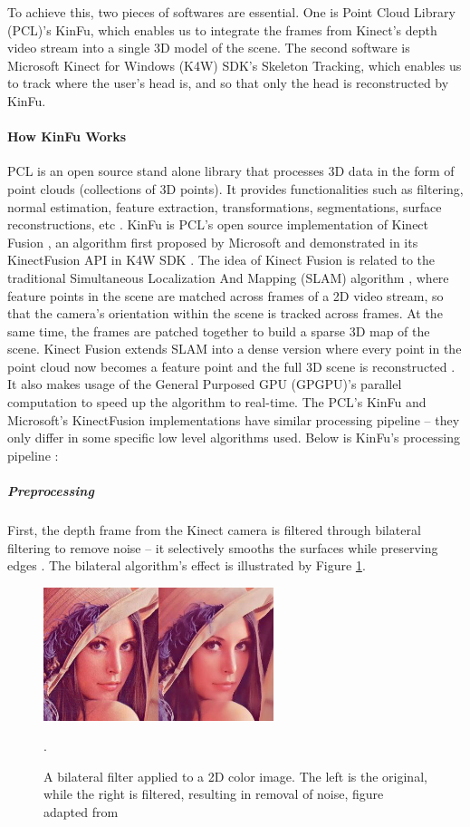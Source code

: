 \documentclass{ut-thesis}
\begin{document}
To achieve this, two pieces of softwares are essential.  One is Point Cloud Library (PCL)'s KinFu, which enables us to integrate the frames from Kinect's depth video stream into a single 3D model of the scene.  The second software is Microsoft Kinect for Windows (K4W) SDK's Skeleton Tracking, which enables us to track where the user's head is, and so that only the head is reconstructed by KinFu.

\paragraph{How KinFu Works}
PCL is an open source stand alone library that processes 3D data in the form of point clouds (collections of 3D points).  It provides functionalities such as filtering, normal estimation, feature extraction, transformations, segmentations, surface reconstructions, etc \cite{rusu20113d}.  KinFu is PCL's open source implementation of Kinect Fusion \cite{pirovano2011kinfu}, an algorithm first proposed by Microsoft and demonstrated in its KinectFusion API in K4W SDK \cite{newcombe2011kinectfusion}.  The idea of Kinect Fusion is related to the traditional Simultaneous Localization And Mapping (SLAM) algorithm \cite{pirovano2011kinfu}, where feature points in the scene are matched across frames of a 2D video stream, so that the camera's orientation within the scene is tracked across frames.  At the same time, the frames are patched together to build a sparse 3D map of the scene.  Kinect Fusion extends SLAM into a dense version where every point in the point cloud now becomes a feature point and the full 3D scene is reconstructed \cite{newcombe2011kinectfusion}. It also makes usage of the General Purposed GPU (GPGPU)'s parallel computation to speed up the algorithm to real-time.  The PCL's KinFu and Microsoft's KinectFusion implementations have similar processing pipeline -- they only differ in some specific low level algorithms used.  Below is KinFu's processing pipeline \cite{newcombe2011kinectfusion}:

\subparagraph{Preprocessing}
First, the depth frame from the Kinect camera is filtered through bilateral filtering to remove noise -- it selectively smooths the surfaces while preserving edges \cite{tomasi1998bilateral}.  The bilateral algorithm's effect is illustrated by Figure \ref{fig:bilateralFiltering}.
\begin{figure} [h]
	\centering
	\includegraphics[width=0.6\textwidth]{./img/bilateral_filtering.jpg}
	\caption{A bilateral filter applied to a 2D color image.  The left is the original, while the right is filtered, resulting in removal of noise, figure adapted from \cite{pirovano2011kinfu}}.
	\label{fig:bilateralFiltering}
\end{figure}
\end{document}
